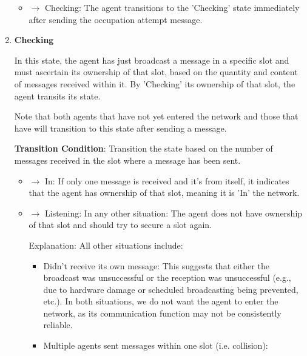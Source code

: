 \begin{enumerate}
    \begin{itemize}
        \item $\rightarrow$ Checking: The agent transitions to the 'Checking' state immediately after sending the occupation attempt message.
    \end{itemize}


    \item \textbf{Checking}
    
    In this state, the agent has just broadcast a message in a specific slot and must ascertain its ownership of that slot, based on the quantity and content of messages received within it.
    By 'Checking' its ownership of that slot, the agent transits its state.

    Note that both agents that have not yet entered the network and those that have will transition to this state after sending a message.

    \textbf{Transition Condition}: Transition the state based on the number of messages received in the slot where a message has been sent.
    \begin{itemize}

        \item $\rightarrow$ In: If only one message is received and it's from itself, it indicates that the agent has ownership of that slot, meaning it is 'In' the network.
        \item $\rightarrow$ Listening: In any other situation: The agent does not have ownership of that slot and should try to secure a slot again.
        
        Explanation: All other situations include:
        \begin{itemize}
            \item Didn't receive its own message: This suggests that either the broadcast was unsuccessful or the reception was unsuccessful (e.g., due to hardware damage or scheduled broadcasting being prevented, etc.). In both situations, we do not want the agent to enter the network, as its communication function may not be consistently reliable.
            \item Multiple agents sent messages within one slot (i.e. collision):
            

\end{itemize}
\end{itemize}
\end{enumerate}
